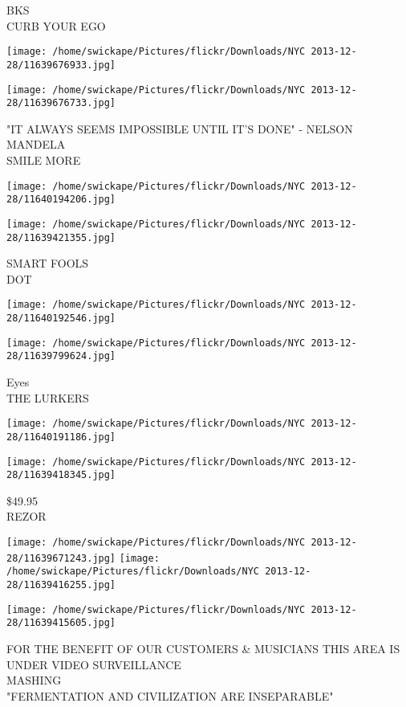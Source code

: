 \documentclass[10pt,letterpaper]{article}
\begin{document}
BKS\\
CURB YOUR EGO
\pagebreak

\texttt{[image: /home/swickape/Pictures/flickr/Downloads/NYC 2013-12-28/11639676933.jpg]}

\vspace{0.25in}
\texttt{[image: /home/swickape/Pictures/flickr/Downloads/NYC 2013-12-28/11639676733.jpg]}

"IT ALWAYS SEEMS IMPOSSIBLE UNTIL IT'S DONE" {-} NELSON MANDELA\\
SMILE MORE
\pagebreak

\texttt{[image: /home/swickape/Pictures/flickr/Downloads/NYC 2013-12-28/11640194206.jpg]}

\vspace{0.25in}
\texttt{[image: /home/swickape/Pictures/flickr/Downloads/NYC 2013-12-28/11639421355.jpg]}

SMART FOOLS\\
DOT
\pagebreak

\texttt{[image: /home/swickape/Pictures/flickr/Downloads/NYC 2013-12-28/11640192546.jpg]}

\vspace{0.25in}
\texttt{[image: /home/swickape/Pictures/flickr/Downloads/NYC 2013-12-28/11639799624.jpg]}

Eyes\\
THE LURKERS
\pagebreak

\texttt{[image: /home/swickape/Pictures/flickr/Downloads/NYC 2013-12-28/11640191186.jpg]}

\vspace{0.25in}
\texttt{[image: /home/swickape/Pictures/flickr/Downloads/NYC 2013-12-28/11639418345.jpg]}

\$49.95\\
REZOR
\pagebreak

\texttt{[image: /home/swickape/Pictures/flickr/Downloads/NYC 2013-12-28/11639671243.jpg]}
\texttt{[image: /home/swickape/Pictures/flickr/Downloads/NYC 2013-12-28/11639416255.jpg]}

\vspace{0.25in}
\texttt{[image: /home/swickape/Pictures/flickr/Downloads/NYC 2013-12-28/11639415605.jpg]}

FOR THE BENEFIT OF OUR CUSTOMERS \& MUSICIANS THIS AREA IS UNDER VIDEO SURVEILLANCE\\
MASHING\\
"FERMENTATION AND CIVILIZATION ARE INSEPARABLE"
\pagebreak
\end{document}
